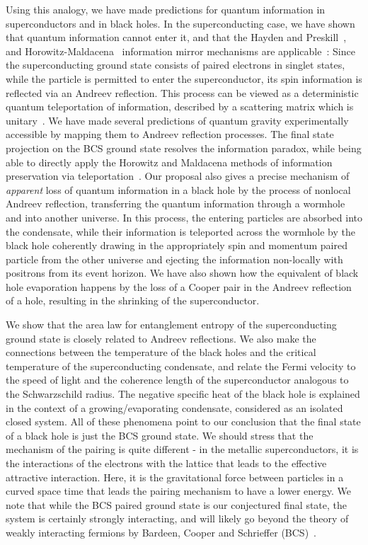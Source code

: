 \documentclass[12pt,letterpaper,aps,onecolumn,superscriptaddress,floatfix,notitlepage]{revtex4-1}
\begin{document}
	Using this analogy, we have made predictions for quantum information in superconductors and in black holes.  In the superconducting case, we have shown that quantum information cannot enter it, and that the Hayden and Preskill~\cite{preskill}, and Horowitz-Maldacena~\cite{horowitz} information mirror mechanisms are applicable~\cite{preskill,horowitz,projection}:   Since the superconducting ground state consists of paired electrons in singlet states, while the particle is permitted to enter the superconductor, its spin information is reflected via an Andreev reflection. This process can be viewed as a deterministic quantum  teleportation of information, described by a scattering matrix which is unitary~\cite{projection,horowitz}.  We have made several predictions of quantum gravity experimentally accessible by mapping them to Andreev reflection processes. The final state projection on the BCS ground state resolves the information paradox, while being able to directly apply the Horowitz and Maldacena methods of information preservation via teleportation~\cite{horowitz}.
	Our proposal also gives a precise mechanism of {\it apparent} loss of quantum information in a black hole by the process of nonlocal Andreev reflection, transferring the quantum information through a wormhole and into another universe.  In this process, the entering particles are absorbed into the condensate, while their information is teleported across the wormhole by the black hole coherently drawing in the appropriately spin and momentum paired particle from the other universe and ejecting the information non-locally with positrons from its event horizon.  We have also shown how the equivalent of black hole evaporation happens by the loss of a Cooper pair in the Andreev reflection of a hole, resulting in the shrinking of the superconductor. 
	
	We show that the area law for entanglement entropy of the superconducting ground state is closely related to Andreev reflections. We also make the connections between the temperature of the black holes and the critical temperature of the superconducting condensate, and relate the Fermi velocity to the speed of light and the coherence length of the superconductor analogous to the Schwarzschild radius. The negative specific heat of the black hole is explained in the context of a growing/evaporating condensate, considered as an isolated closed system. All of these phenomena point to our conclusion that the final state of a black hole is just the BCS ground state.  We should stress that the mechanism of the pairing is quite different - in the metallic superconductors, it is the interactions of the electrons with the lattice that leads to the effective attractive interaction.  Here, it is the gravitational force between particles in a curved space time that leads the pairing mechanism to have a lower energy. We note that while the BCS paired ground state is our conjectured final state, the system is certainly strongly interacting, and will likely go beyond the theory of weakly interacting fermions by Bardeen, Cooper and Schrieffer (BCS)~\cite{BCS}.
\end{document}
